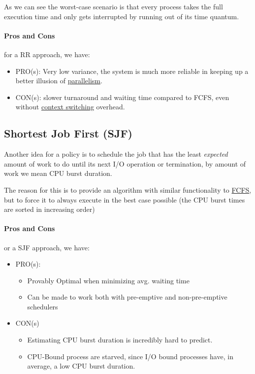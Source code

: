 \documentclass[openright, twoside]{report}
\theoremstyle{definition}
\theoremstyle{example}
\begin{document}
			As we can see the worst-case scenario is that every process takes the full
			execution time and only gets interrupted by running out of its time quantum.

			\paragraph{Pros and Cons}
			for a RR approach, we have:
			\begin{itemize}
				\item PRO(s): Very low variance, the system is much more reliable in 
				keeping up a better illusion of \hyperref[par:parallel]{parallelism}.
				\item CON(s): slower turnaround and waiting time compared to FCFS, even
				without \hyperref[ssec:context]{context switching} overhead.
			\end{itemize}
		
		\subsection{Shortest Job First (SJF)}
		\label{ssec:SJF}
			Another idea for a policy is to schedule the job that has the least 
			\emph{expected} amount of work to do until its next I/O operation 
			or termination, by amount of work we mean CPU burst duration.

			The reason for this is to provide an algorithm with similar functionality to 
			\hyperref[ssec:FCFS]{FCFS}, but to force it to always execute in the best case
			possible (the CPU burst times are sorted in increasing order)

			\paragraph{Pros and Cons}
			or a SJF approach, we have:
			\begin{itemize}
				\item PRO(s):
				\begin{itemize}
					\item Provably Optimal when minimizing avg. waiting time
					\item Can be made to work both with pre-emptive and non-pre-emptive 
					schedulers
				\end{itemize}
				\item CON(s)
				\begin{itemize}
					\item Estimating CPU burst duration is incredibly hard to predict.
					\item CPU-Bound process are starved, since I/O bound processes have,
					in average, a low CPU burst duration.
				\end{itemize}
			\end{itemize}
		
\end{document}
